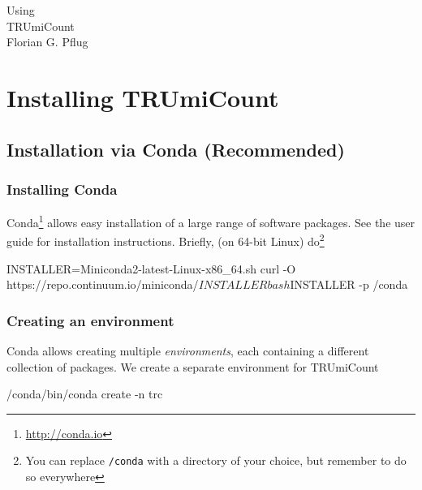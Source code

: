 \documentclass[10pt]{article}
\begin{document}
\begin{titlepage}
\vfill
{\Huge\centering%
Using\\
TRUmiCount\\}
\vskip5cm
{\large\centering%
Florian G. Pflug\\}
\vfill
\tableofcontents
\vfill
\end{titlepage}



\newpage
\section{Installing TRUmiCount}

\subsection{Installation via Conda (Recommended)}

\subsubsection*{Installing Conda}

Conda\footnote{\url{http://conda.io}} allows easy installation of a large range of software packages. See the user guide for installation instructions. Briefly, (on 64-bit Linux) do\footnote{You can replace \texttt{/conda} with a directory of your choice, but remember to do so everywhere}

\begin{shellcode}
INSTALLER=Miniconda2-latest-Linux-x86_64.sh
curl -O https://repo.continuum.io/miniconda/$INSTALLER
bash $INSTALLER -p /conda
\end{shellcode}

\subsubsection*{Creating an environment}

Conda allows creating multiple \emph{environments}, each containing a different collection of packages. We create a separate environment for TRUmiCount

\begin{shellcode}
/conda/bin/conda create -n trc
\end{shellcode}
\end{document}
